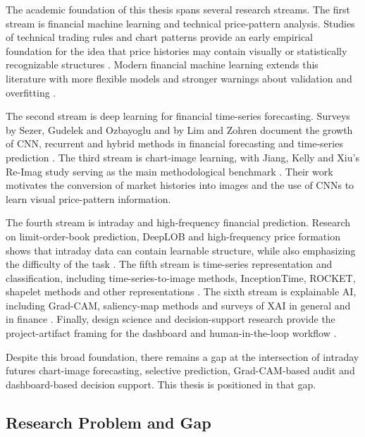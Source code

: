 The academic foundation of this thesis spans several research streams. The first stream is financial machine learning and technical price-pattern analysis. Studies of technical trading rules and chart patterns provide an early empirical foundation for the idea that price histories may contain visually or statistically recognizable structures \cite{brock_technical_trading,lo_foundations_technical_analysis}. Modern financial machine learning extends this literature with more flexible models and stronger warnings about validation and overfitting \cite{lopez_de_prado_afml,bailey_deflated_sharpe}.

The second stream is deep learning for financial time-series forecasting. Surveys by Sezer, Gudelek and Ozbayoglu and by Lim and Zohren document the growth of CNN, recurrent and hybrid methods in financial forecasting and time-series prediction \cite{sezer_financial_forecasting_survey,lim_zohren_time_series_forecasting}. The third stream is chart-image learning, with Jiang, Kelly and Xiu's Re-Imag study serving as the main methodological benchmark \cite{jiang_reimagining_price_trends}. Their work motivates the conversion of market histories into images and the use of CNNs to learn visual price-pattern information.

The fourth stream is intraday and high-frequency financial prediction. Research on limit-order-book prediction, DeepLOB and high-frequency price formation shows that intraday data can contain learnable structure, while also emphasizing the difficulty of the task \cite{deeplob,zhang_lob_cnn,sirignano_cont_universal}. The fifth stream is time-series representation and classification, including time-series-to-image methods, InceptionTime, ROCKET, shapelet methods and other representations \cite{wang_oates_imaging_time_series,fawaz_tsc_review,inceptiontime,rocket}. The sixth stream is explainable AI, including Grad-CAM, saliency-map methods and surveys of XAI in general and in finance \cite{guidotti_survey,adadi_berrada_xai,arrieta_xai,weber_xai_finance}. Finally, design science and decision-support research provide the project-artifact framing for the dashboard and human-in-the-loop workflow \cite{hevner_dsr,peffers_dsrm,venable_feds}.

Despite this broad foundation, there remains a gap at the intersection of intraday futures chart-image forecasting, selective prediction, Grad-CAM-based audit and dashboard-based decision support. This thesis is positioned in that gap.

\subsection{Research Problem and Gap}
\label{subsec:problem_gap}

